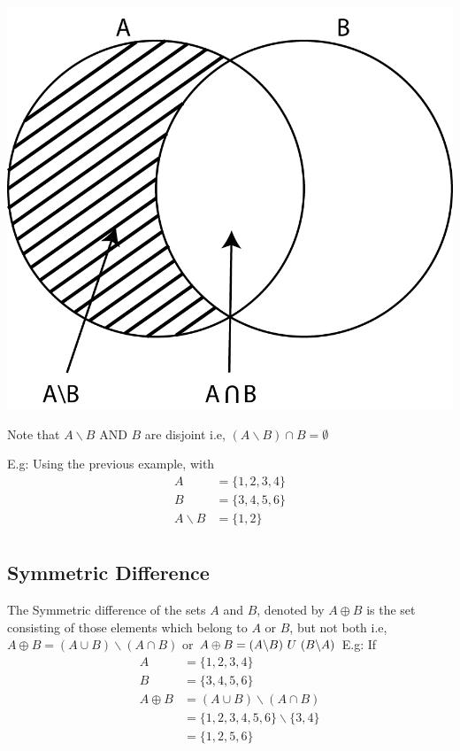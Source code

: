 \begin{center}
    \includegraphics[width=0.5\linewidth]{chapter/sets and elements/intersection.png}
\end{center}


\begin{para}
    Note that $A\backslash B$ AND $B$ are disjoint i.e, $(A\backslash B) \cap B = \emptyset$
\end{para}

\begin{para}
    E.g: Using the previous example, with
    \begin{align*}
        A             & = \{1,2,3,4\} \\
        B             & = \{3,4,5,6\} \\
        A\backslash B & = \{1,2\}     \\
    \end{align*}

\end{para}


\subsection{Symmetric Difference}

\begin{para}
    The Symmetric difference of the sets $A$ and $B$, denoted by $A \oplus B$ is the set consisting of those elements which belong to $A$ or $B$, but not both i.e, $A \oplus B = (A \cup B)\backslash (A \cap B)$ or $A \oplus B = (A \backslash B)\nobreakspace U \nobreakspace(B\backslash A)$
    E.g: If
    \begin{align*}
        A          & =\{1,2,3,4\}                       \\
        B          & =\{3,4,5,6\}                       \\
        A \oplus B & = (A \cup B)\backslash (A \cap B)  \\
                   & =\{1,2,3,4,5,6\}\backslash \{3,4\} \\
                   & = \{1,2,5,6\}                      \\
    \end{align*}
\end{para}

